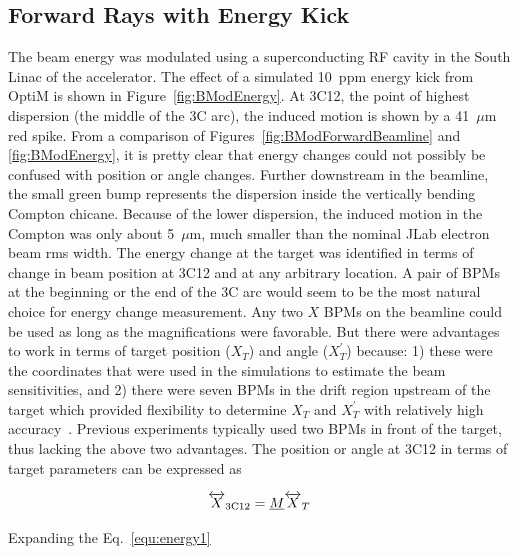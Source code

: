 \subsection{Forward Rays with Energy Kick}
\label{Forward Rays with Energy Kick}
The beam energy was modulated using a superconducting RF cavity in the South Linac of the accelerator. The effect of a simulated 10~ppm energy kick from OptiM is shown in Figure~\ref{fig:BModEnergy}.  At 3C12, the point of highest dispersion (the middle of the 3C arc), the induced motion is shown by a 41~$\mu$m red spike.  From a comparison of Figures~\ref{fig:BModForwardBeamline} and \ref{fig:BModEnergy}, it is pretty clear that energy changes could not possibly be confused with position or angle changes. Further downstream in the beamline, the small green bump represents the dispersion inside the vertically bending Compton chicane. Because of the lower dispersion, the induced motion in the Compton was only about 5~$\mu$m, much smaller than the nominal JLab electron beam rms width. 
The energy change at the target was identified in terms of change in beam position at 3C12 and at any arbitrary location. A pair of BPMs at the beginning or the end of the 3C arc would seem to be the most natural choice for energy change measurement. Any two $X$ BPMs on the beamline could be used as long as the magnifications were favorable. But there were advantages to work in terms of target position ($X_{T}$) and angle ($X^{\prime}_{T}$) because: 1) these were the coordinates that were used in the simulations to estimate the beam sensitivities, and 2) there were seven BPMs in the drift region upstream of the target which provided flexibility to determine $X_{T}$ and $X^{\prime}_{T}$ with relatively high accuracy~\cite{nur_linear_reg}. Previous experiments typically used two BPMs in front of the target, thus lacking the above two advantages.
The position or angle at 3C12 in terms of target parameters can be expressed as

\begin{equation} \label{equ:energy1}
\overleftrightarrow{X}_{\rm 3C12} = \underline{M} \overleftrightarrow{X}_{T}
\end{equation}

Expanding the Eq.~\ref{equ:energy1}

